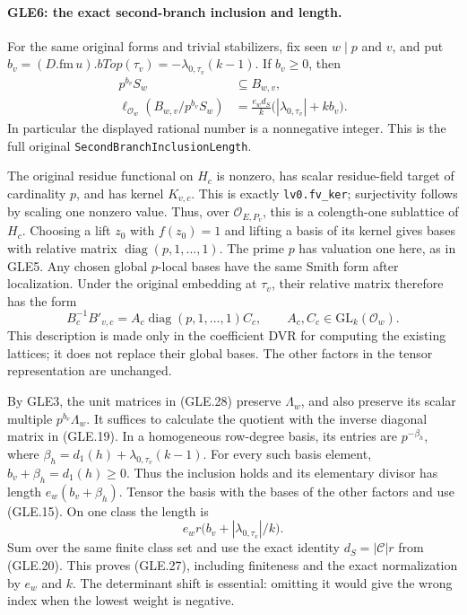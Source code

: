 \paragraph{GLE6: the exact second-branch inclusion and length.}
\label{claim:GLE6}
For the same original forms and trivial stabilizers, fix seen $w\mid p$
and $v$, and put
$b_v=(D.\mathrm{fm}\,u).bTop(\tau_v)=-\lambda_{0,\tau_v}(k-1)$.
If $b_v\ge0$, then
\[
 \begin{split}
 p^{b_v}S_w&\subseteq B_{w,v},\\
 \ell_{\mathcal O_w}(B_{w,v}/p^{b_v}S_w)
   &=\frac{e_wd_S}{k}
           \bigl(|\lambda_{0,\tau_v}|+kb_v\bigr).
 \end{split}                                      \tag{GLE.27}
\]
In particular the displayed rational number is a nonnegative integer.
This is the full original \texttt{SecondBranchInclusionLength}.

The original residue functional on $H_c$ is nonzero, has scalar
residue-field target of cardinality $p$, and has kernel $K_{v,c}$.
This is exactly \texttt{lv0.fv\_ker}; surjectivity follows by scaling
one nonzero value.  Thus, over $\mathcal O_{E,P_v}$, this is a
colength-one sublattice of $H_c$.  Choosing a lift $z_0$ with
$f(z_0)=1$ and lifting a basis of its kernel gives bases with relative
matrix $\operatorname{diag}(p,1,\ldots,1)$.  The prime $p$ has valuation
one here, as in GLE5.  Any chosen global $p$-local bases have the same
Smith form after localization.  Under the original embedding at
$\tau_v$, their relative matrix therefore has the form
\[
 B_c^{-1}B'_{v,c}
       =A_c\operatorname{diag}(p,1,\ldots,1)C_c,
       \qquad A_c,C_c\in\mathrm{GL}_k(\mathcal O_w).
 \tag{GLE.28}
\]
This description is made only in the coefficient DVR for computing
the existing lattices; it does not replace their global bases.
The other factors in the tensor representation are unchanged.

By GLE3, the unit matrices in (GLE.28) preserve $\Lambda_w$, and
also preserve its scalar multiple $p^{b_v}\Lambda_w$.
It suffices to calculate the quotient with the inverse diagonal
matrix in (GLE.19).  In a homogeneous row-degree basis, its entries
are $p^{-\beta_h}$, where
$\beta_h=d_1(h)+\lambda_{0,\tau_v}(k-1)$.
For every such basis element,
$b_v+\beta_h=d_1(h)\ge0$.  Thus the inclusion holds and its elementary
divisor has length $e_w(b_v+\beta_h)$.  Tensor the basis with the
bases of the other factors and use (GLE.15).  On one class the length
is
\[
                  e_wr\bigl(b_v+|\lambda_{0,\tau_v}|/k\bigr).
\]
Sum over the same finite class set and use the exact identity
$d_S=|\mathcal C|r$ from (GLE.20).  This proves (GLE.27), including
finiteness and the exact normalization by $e_w$ and $k$.
The determinant shift is essential: omitting it would give the wrong
index when the lowest weight is negative.

